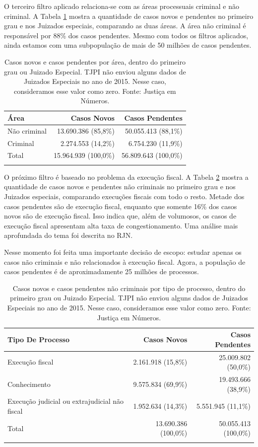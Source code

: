 \documentclass[]{report}
\begin{document}
O terceiro filtro aplicado relaciona-se com as áreas processuais
criminal e não criminal. A Tabela \ref{tab:crim} mostra a quantidade de
casos novos e pendentes no primeiro grau e nos Juizados especiais,
comparando as duas áreas. A área não criminal é responsável por 88\% dos
casos pendentes. Mesmo com todos os filtros aplicados, ainda estamos com
uma subpopulação de mais de 50 milhões de casos pendentes.

\begin{longtable}{lrr}
\caption{Casos novos e casos pendentes por área, dentro do primeiro grau ou Juizado Especial. TJPI não enviou alguns dados de Juizados Especiais no ano de 2015. Nesse caso, consideramos esse valor como zero. Fonte: Justiça em Números.} \\
  \hline
Área & Casos Novos & Casos Pendentes \\
  \hline
Não criminal & 13.690.386 (85,8\%) & 50.055.413 (88,1\%) \\
  Criminal & 2.274.553 (14,2\%) & 6.754.230 (11,9\%) \\
  \hline
  Total & 15.964.939 (100,0\%) & 56.809.643 (100,0\%) \\
\hline
\label{tab:crim}
\end{longtable}

O próximo filtro é baseado no problema da execução fiscal. A Tabela
\ref{tab:fiscal} mostra a quantidade de casos novos e pendentes não
criminais no primeiro grau e nos Juizados especiais, comparando
execuções fiscais com todo o resto. Metade dos casos pendentes são de
execução fiscal, enquanto que somente 16\% dos casos novos são de
execução fiscal. Isso indica que, além de volumosos, os casos de
execução fiscal apresentam alta taxa de congestionamento. Uma análise
mais aprofundada do tema foi descrita no RJN.

Nesse momento foi feita uma importante decisão de escopo: estudar apenas
os casos não criminais e não relacionados à execução fiscal. Agora, a
população de casos pendentes é de aproximadamente 25 milhões de
processos.

\begin{longtable}{lrr}
\caption{Casos novos e casos pendentes não criminais por tipo de processo, dentro do primeiro grau ou Juizado Especial. TJPI não enviou alguns dados de Juizados Especiais no ano de 2015. Nesse caso, consideramos esse valor como zero. Fonte: Justiça em Números.} \\
  \hline
Tipo De Processo & Casos Novos & Casos Pendentes \\
  \hline
Execução fiscal & 2.161.918 (15,8\%) & 25.009.802 (50,0\%) \\
  Conhecimento & 9.575.834 (69,9\%) & 19.493.666 (38,9\%) \\
  Execução judicial ou extrajudicial não fiscal & 1.952.634 (14,3\%) & 5.551.945 (11,1\%) \\
  \hline
  Total & 13.690.386 (100,0\%) & 50.055.413 (100,0\%) \\
\hline
\label{tab:fiscal}
\end{longtable}
\end{document}
